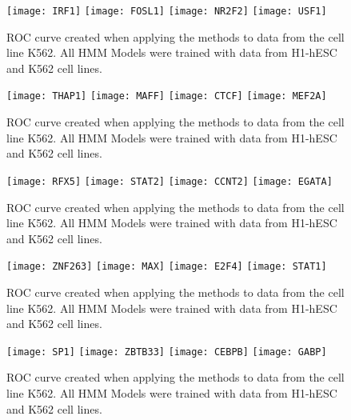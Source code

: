 \documentclass[11pt,a4]{article}
\begin{document}
\begin{figure}[h]
\centering
    \texttt{[image: IRF1]}
    \texttt{[image: FOSL1]}
    \texttt{[image: NR2F2]}
    \texttt{[image: USF1]}
\caption{ROC curve created when applying the methods to data from the cell line K562. All HMM Models were trained with data from H1-hESC and K562 cell lines.}
\label{fig:roc.K562.fdr_4.11}
\end{figure}

\begin{figure}[h]
\centering
    \texttt{[image: THAP1]}
    \texttt{[image: MAFF]}
    \texttt{[image: CTCF]}
    \texttt{[image: MEF2A]}
\caption{ROC curve created when applying the methods to data from the cell line K562. All HMM Models were trained with data from H1-hESC and K562 cell lines.}
\label{fig:roc.K562.fdr_4.12}
\end{figure}

\begin{figure}[h]
\centering
    \texttt{[image: RFX5]}
    \texttt{[image: STAT2]}
    \texttt{[image: CCNT2]}
    \texttt{[image: EGATA]}
\caption{ROC curve created when applying the methods to data from the cell line K562. All HMM Models were trained with data from H1-hESC and K562 cell lines.}
\label{fig:roc.K562.fdr_4.13}
\end{figure}

\begin{figure}[h]
\centering
    \texttt{[image: ZNF263]}
    \texttt{[image: MAX]}
    \texttt{[image: E2F4]}
    \texttt{[image: STAT1]}
\caption{ROC curve created when applying the methods to data from the cell line K562. All HMM Models were trained with data from H1-hESC and K562 cell lines.}
\label{fig:roc.K562.fdr_4.14}
\end{figure}

\begin{figure}[h]
\centering
    \texttt{[image: SP1]}
    \texttt{[image: ZBTB33]}
    \texttt{[image: CEBPB]}
    \texttt{[image: GABP]}
\caption{ROC curve created when applying the methods to data from the cell line K562. All HMM Models were trained with data from H1-hESC and K562 cell lines.}
\label{fig:roc.K562.fdr_4.15}
\end{figure}
\end{document}
